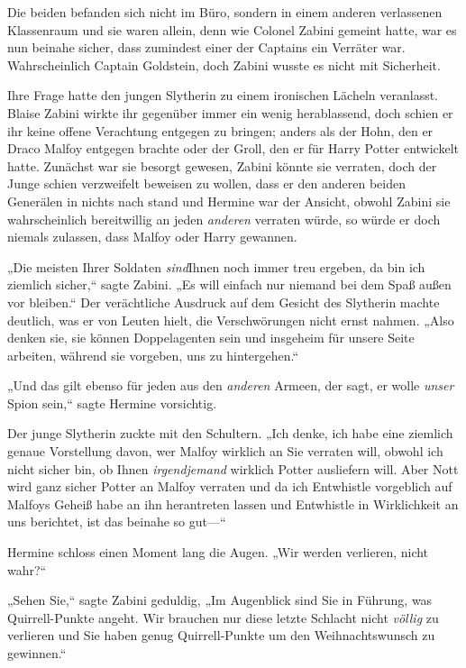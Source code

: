 {Die beiden befanden sich nicht im Büro, sondern in einem anderen verlassenen Klassenraum und sie waren allein, denn wie Colonel Zabini gemeint hatte, war es nun beinahe sicher, dass zumindest einer der Captains ein Verräter war. Wahrscheinlich Captain Goldstein, doch Zabini wusste es nicht mit Sicherheit.

Ihre Frage hatte den jungen Slytherin zu einem ironischen Lächeln veranlasst. Blaise Zabini wirkte ihr gegenüber immer ein wenig herablassend, doch schien er ihr keine offene Verachtung entgegen zu bringen; anders als der Hohn, den er Draco Malfoy entgegen brachte oder der Groll, den er für Harry Potter entwickelt hatte. Zunächst war sie besorgt gewesen, Zabini könnte sie verraten, doch der Junge schien verzweifelt beweisen zu wollen, dass er den anderen beiden Generälen in nichts nach stand und Hermine war der Ansicht, obwohl Zabini sie wahrscheinlich bereitwillig an jeden \emph{anderen} verraten würde, so würde er doch niemals zulassen, dass Malfoy oder Harry gewannen.

„Die meisten Ihrer Soldaten \emph{sind}Ihnen noch immer treu ergeben, da bin ich ziemlich sicher,“ sagte Zabini. „Es will einfach nur niemand bei dem Spaß außen vor bleiben.“ Der verächtliche Ausdruck auf dem Gesicht des Slytherin machte deutlich, was er von Leuten hielt, die Verschwörungen nicht ernst nahmen. „Also denken sie, sie können Doppelagenten sein und insgeheim für unsere Seite arbeiten, während sie vorgeben, uns zu hintergehen.“

„Und das gilt ebenso für jeden aus den \emph{anderen} Armeen, der sagt, er wolle \emph{unser} Spion sein,“ sagte Hermine vorsichtig.

Der junge Slytherin zuckte mit den Schultern. „Ich denke, ich habe eine ziemlich genaue Vorstellung davon, wer Malfoy wirklich an Sie verraten will, obwohl ich nicht sicher bin, ob Ihnen \emph{irgendjemand} wirklich Potter ausliefern will. Aber Nott wird ganz sicher Potter an Malfoy verraten und da ich Entwhistle vorgeblich auf Malfoys Geheiß habe an ihn herantreten lassen und Entwhistle in Wirklichkeit an uns berichtet, ist das beinahe so gut—“

Hermine schloss einen Moment lang die Augen. „Wir werden verlieren, nicht wahr?“

„Sehen Sie,“ sagte Zabini geduldig, „Im Augenblick sind Sie in Führung, was Quirrell-Punkte angeht. Wir brauchen nur diese letzte Schlacht nicht \emph{völlig} zu verlieren und Sie haben genug Quirrell-Punkte um den Weihnachtswunsch zu gewinnen.“

}
